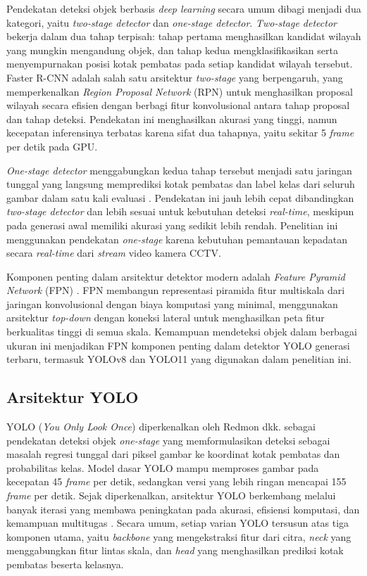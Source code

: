 Pendekatan deteksi objek berbasis \textit{deep learning} secara umum dibagi menjadi dua 
kategori, yaitu \textit{two-stage detector} dan \textit{one-stage detector}. 
\textit{Two-stage detector} bekerja dalam dua tahap terpisah: tahap pertama menghasilkan 
kandidat wilayah yang mungkin mengandung objek, dan tahap kedua mengklasifikasikan serta 
menyempurnakan posisi kotak pembatas pada setiap kandidat wilayah tersebut. Faster R-CNN 
\cite{ren2015faster} adalah salah satu arsitektur \textit{two-stage} yang berpengaruh, 
yang memperkenalkan \textit{Region Proposal Network} (RPN) untuk menghasilkan proposal 
wilayah secara efisien dengan berbagi fitur konvolusional antara tahap proposal dan tahap 
deteksi. Pendekatan ini menghasilkan akurasi yang tinggi, namun kecepatan inferensinya 
terbatas karena sifat dua tahapnya, yaitu sekitar 5 \textit{frame} per detik pada GPU.

\textit{One-stage detector} menggabungkan kedua tahap tersebut menjadi satu jaringan 
tunggal yang langsung memprediksi kotak pembatas dan label kelas dari seluruh gambar 
dalam satu kali evaluasi \cite{redmon2016yolo}. Pendekatan ini jauh lebih cepat 
dibandingkan \textit{two-stage detector} dan lebih sesuai untuk kebutuhan deteksi \textit{real-time}, meskipun pada generasi awal memiliki akurasi yang sedikit lebih rendah. Penelitian 
ini menggunakan pendekatan \textit{one-stage} karena kebutuhan pemantauan kepadatan 
secara \textit{real-time} dari \textit{stream} video kamera CCTV.

Komponen penting dalam arsitektur detektor modern adalah \textit{Feature Pyramid Network} 
(FPN) \cite{lin2017fpn}. FPN membangun representasi piramida fitur multiskala dari 
jaringan konvolusional dengan biaya komputasi yang minimal, menggunakan arsitektur 
\textit{top-down} dengan koneksi lateral untuk menghasilkan peta fitur berkualitas tinggi 
di semua skala. Kemampuan mendeteksi objek dalam berbagai ukuran ini menjadikan FPN 
komponen penting dalam detektor YOLO generasi terbaru, termasuk YOLOv8 dan YOLO11 yang 
digunakan dalam penelitian ini.

\subsection{Arsitektur YOLO}

YOLO (\textit{You Only Look Once}) diperkenalkan oleh Redmon dkk. \cite{redmon2016yolo} 
sebagai pendekatan deteksi objek \textit{one-stage} yang memformulasikan deteksi sebagai 
masalah regresi tunggal dari piksel gambar ke koordinat kotak pembatas dan probabilitas 
kelas. Model dasar YOLO mampu memproses gambar pada kecepatan 45 \textit{frame} per detik, 
sedangkan versi yang lebih ringan mencapai 155 \textit{frame} per detik. Sejak 
diperkenalkan, arsitektur YOLO berkembang melalui banyak iterasi yang membawa peningkatan 
pada akurasi, efisiensi komputasi, dan kemampuan multitugas \cite{terven2023comprehensive}. 
Secara umum, setiap varian YOLO tersusun atas tiga komponen utama, yaitu \textit{backbone} 
yang mengekstraksi fitur dari citra, \textit{neck} yang menggabungkan fitur lintas skala, 
dan \textit{head} yang menghasilkan prediksi kotak pembatas beserta kelasnya.

